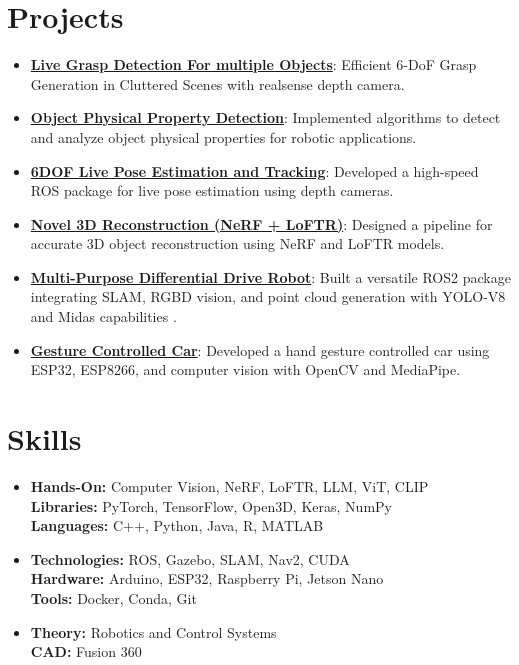 \documentclass[letterpaper,11pt]{article}
\newcommand{\resumeItem}[2]{
  \item\small{
    \textbf{#1}{: #2 \vspace{-2pt}}
  }
}
\newcommand{\resumeSubItem}[2]{\resumeItem{#1}{#2}\vspace{-4pt}}
\newcommand{\resumeSubHeadingListStart}{\begin{itemize}[leftmargin=*]}
\newcommand{\resumeSubHeadingListEnd}{\end{itemize}}
\begin{document}
\section{Projects}
\resumeSubHeadingListStart
  \resumeSubItem{\href{https://github.com/Kaivalya192/contact_graspnet}{Live Grasp Detection For multiple Objects}}
    {Efficient 6-DoF Grasp Generation in Cluttered Scenes with realsense depth camera.}
  \resumeSubItem{\href{https://github.com/Kaivalya192/Object-Property-Detection}{Object Physical Property Detection}}
    {Implemented algorithms to detect and analyze object physical properties for robotic applications.}
  \resumeSubItem{\href{https://github.com/Kaivalya192/live-pose-ros}{6DOF Live Pose Estimation and Tracking}}
    {Developed a high-speed ROS package for live pose estimation using depth cameras.}
  \resumeSubItem{\href{https://github.com/Kaivalya192/Object_Reconstruction}{Novel 3D Reconstruction (NeRF + LoFTR)}}
    {Designed a pipeline for accurate 3D object reconstruction using NeRF and LoFTR models.}
  \resumeSubItem{\href{https://github.com/Kaivalya192/bot_spawn}{Multi-Purpose Differential Drive Robot}}
    {Built a versatile ROS2 package integrating SLAM, RGBD vision, and point cloud generation with YOLO-V8 and Midas capabilities .}
  \resumeSubItem{\href{https://github.com/Kaivalya192/gesture_car}{Gesture Controlled Car}}
    {Developed a hand gesture controlled car using ESP32, ESP8266, and computer vision with OpenCV and MediaPipe.}
\resumeSubHeadingListEnd

\section{Skills}
\resumeSubHeadingListStart
  \item{
    \textbf{Hands-On:} Computer Vision, NeRF, LoFTR, LLM, ViT, CLIP \\
    \textbf{Libraries:} PyTorch, TensorFlow, Open3D, Keras, NumPy \\
    \textbf{Languages:} C++, Python, Java, R, MATLAB
  }
  \item{
    \textbf{Technologies:} ROS, Gazebo, SLAM, Nav2, CUDA \\
    \textbf{Hardware:} Arduino, ESP32, Raspberry Pi, Jetson Nano \\
    \textbf{Tools:} Docker, Conda, Git
  }
  \item{
    \textbf{Theory:} Robotics and Control Systems \\
    \textbf{CAD:} Fusion 360
  }
\resumeSubHeadingListEnd

\end{document}
